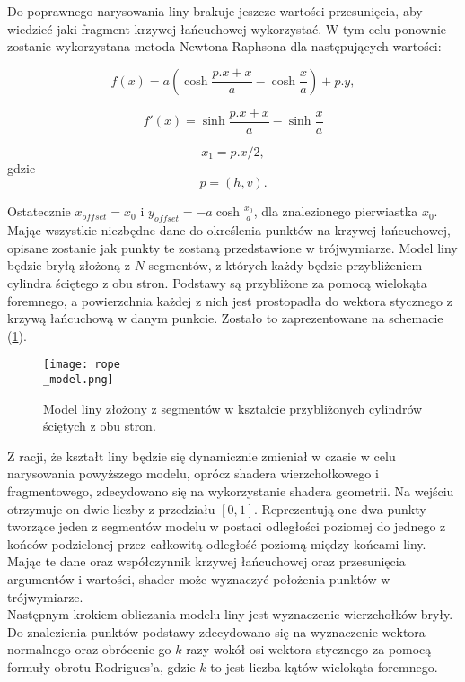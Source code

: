 Do poprawnego narysowania liny brakuje jeszcze wartości przesunięcia, aby wiedzieć jaki fragment krzywej łańcuchowej wykorzystać. W tym celu ponownie zostanie wykorzystana metoda Newtona-Raphsona dla następujących wartości:


$$
f(x) =  a \left( \cosh \frac{p.x + x}{a} - \cosh \frac{x}{a} \right) + p.y,
$$

$$
f'(x) = \sinh \frac{p.x + x}{a} - \sinh \frac{x}{a}
$$

$$
x_1 = p.x / 2,
$$
gdzie
$$
p = (h, v).
$$

Ostatecznie $x_{offset} = x_0$ i $y_{offset} = -a\cosh \frac{x_0}{a}$, dla znalezionego pierwiastka $x_0$.
\\

Mając wszystkie niezbędne dane do określenia punktów na krzywej łańcuchowej, opisane zostanie jak punkty te zostaną przedstawione w trójwymiarze. Model liny będzie bryłą złożoną z $N$ segmentów, z których każdy będzie przybliżeniem cylindra ściętego z obu stron. Podstawy są przybliżone za pomocą wielokąta foremnego, a powierzchnia każdej z nich jest prostopadła do wektora stycznego z krzywą łańcuchową w danym punkcie. Zostało to zaprezentowane na schemacie (\ref{rope_model}).
\\

\begin{figure}[h]
	\centering
	\texttt{[image: rope\\\_model.png]}
	\caption{Model liny złożony z segmentów w kształcie przybliżonych cylindrów ściętych z obu stron.}
	\label{rope_model}
\end{figure}

Z racji, że kształt liny będzie się dynamicznie zmieniał w czasie w celu narysowania powyższego modelu, oprócz shadera wierzchołkowego i fragmentowego, zdecydowano się na wykorzystanie shadera geometrii. Na wejściu otrzymuje on dwie liczby z przedziału $[0, 1]$. Reprezentują one dwa punkty tworzące jeden z segmentów modelu w postaci odległości poziomej do jednego z końców podzielonej przez całkowitą odległość poziomą między końcami liny. Mając te dane oraz współczynnik krzywej łańcuchowej oraz przesunięcia argumentów i wartości, shader może wyznaczyć położenia punktów w trójwymiarze. 
\\

Następnym krokiem obliczania modelu liny jest wyznaczenie wierzchołków bryły. Do znalezienia punktów podstawy zdecydowano się na wyznaczenie wektora normalnego oraz obrócenie go $k$ razy wokół osi wektora stycznego za pomocą formuły obrotu Rodrigues'a, gdzie $k$ to jest liczba kątów wielokąta foremnego. 

